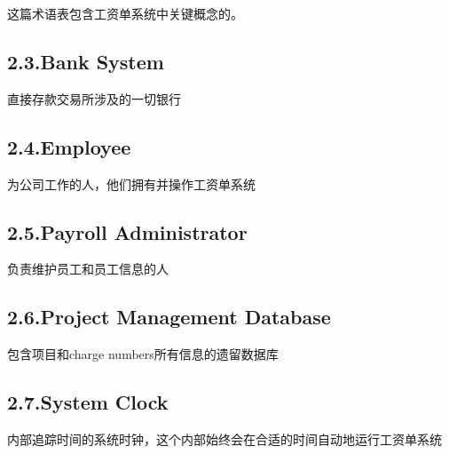 \documentclass{article}
\begin{document}
\noindent{}这篇术语表包含工资单系统中关键概念的。%

\subsection{2.3.\hspace*{0.5em}Bank System}\label{sec-bank-system}%

\noindent{}直接存款交易所涉及的一切银行%

\subsection{2.4.\hspace*{0.5em}Employee}\label{sec-employee}%

\noindent{}为公司工作的人，他们拥有并操作工资单系统%

\subsection{2.5.\hspace*{0.5em}Payroll Administrator}\label{sec-payroll-administrator}%

\noindent{}负责维护员工和员工信息的人%

\subsection{2.6.\hspace*{0.5em}Project Management Database}\label{sec-project-management-database}%

\noindent{}包含项目和charge numbers所有信息的遗留数据库%

\subsection{2.7.\hspace*{0.5em}System Clock}\label{sec-system-clock}%

\noindent{}内部追踪时间的系统时钟，这个内部始终会在合适的时间自动地运行工资单系统%
\end{document}
